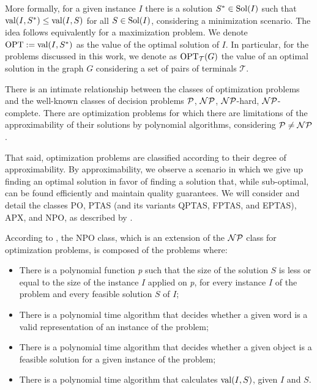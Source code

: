 More formally, for a given instance \(I\) there is a solution \(S^* \in \operatorname{\textrm{Sol}}(I)\) such that \(\operatorname{\textrm{val}}(I, S^*) \leq \operatorname{\textrm{val}}(I, S)\) for all \(S \in \operatorname{\textrm{Sol}}(I)\), considering a minimization scenario. The idea follows equivalently for a maximization problem. We denote \(\operatorname{\textrm{OPT}} := \operatorname{\textrm{val}}(I, S^*)\) as the value of the optimal solution of \(I\). In particular, for the problems discussed in this work, we denote as \(\operatorname{\textrm{OPT}}_{\mathcal{T}}(G)\) the value of an optimal solution in the graph \(G\) considering a set of pairs of terminals \(\mathcal{T}\).

There is an intimate relationship between the classes of optimization problems and the well-known classes of decision problems \(\mathcal{P}\), \(\mathcal{NP}\), \(\mathcal{NP}\)-hard, \(\mathcal{NP}\)-complete. There are optimization problems for which there are limitations of the approximability of their solutions by polynomial algorithms, considering \(\mathcal{P} \neq \mathcal{NP}\).

That said, optimization problems are classified according to their degree of approximability. By approximability, we observe a scenario in which we give up finding an optimal solution in favor of finding a solution that, while sub-optimal, can be found efficiently and maintain quality guarantees. We will consider and detail the classes PO, PTAS (and its variants QPTAS, FPTAS, and EPTAS), APX, and NPO, as described by \cite{livroAprox}.

According to \citeauthor{livroAprox}, the NPO class, which is an extension of the \(\mathcal{NP}\) class for optimization problems, is composed of the problems where:

\begin{itemize}
    \item There is a polynomial function \textit{p} such that the size of the solution \(S\) is less or equal to the size of the instance \(I\) applied on \textit{p}, for every instance \(I\) of the problem and every feasible solution \(S\) of \(I\);
    \item There is a polynomial time algorithm that decides whether a given word is a valid representation of an instance of the problem;
    \item There is a polynomial time algorithm that decides whether a given object is a feasible solution for a given instance of the problem;
    \item There is a polynomial time algorithm that calculates \(\operatorname{\textrm{val}}(I, S)\), given \(I\) and \(S\).
\end{itemize}

